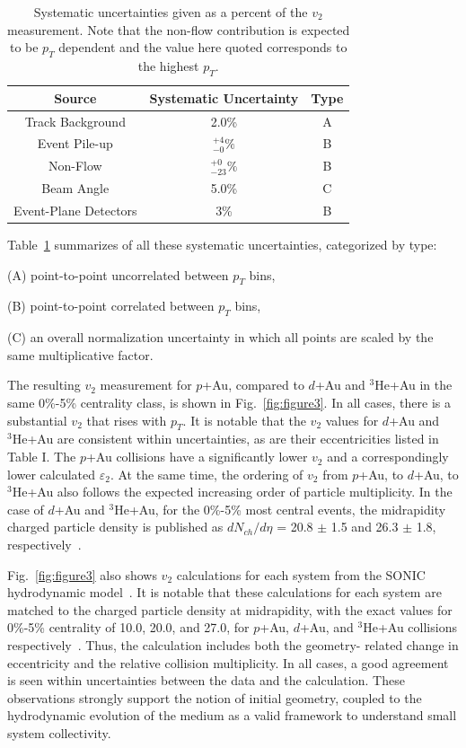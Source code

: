 \documentclass[%
reprint,
showpacs,preprintnumbers,
 amsmath,amssymb,
 aps,
]{revtex4-1}
\newcommand{\pt}{\mbox{$p_T$}\xspace}
\newcommand{\dau}{\mbox{$d$+Au}\xspace}
\newcommand{\pau}{\mbox{$p$+Au}\xspace}
\newcommand{\hau}{\mbox{$^3\text{He}$+Au}\xspace}
\begin{document}
\label{s:sys}
\begin{table}[htbp]
  \begin{center}
    \begin{tabular}{ccc}
      \hline
      \hline
      Source& Systematic Uncertainty & Type \\ \hline
      Track Background &2.0\%& A\\ 
      Event Pile-up    &$^{+4}_{-0}\%$& B\\
      Non-Flow    &$^{+0}_{-23}\%$& B\\
      Beam Angle &5.0\%& C\\  
      Event-Plane Detectors & 3\% & B\\
    \hline
    \hline
    \end{tabular}
   \caption{\label{t:sys}Systematic uncertainties given as a percent of the $v_2$ measurement. Note that the non-flow contribution is expected to be \pt dependent and the value here quoted corresponds to the highest \pt.}
   \end{center}
 \end{table}

Table~\ref{t:sys} summarizes of all these systematic
uncertainties, categorized by type:

(A) point-to-point uncorrelated between $p_T$ bins,

(B) point-to-point correlated between $p_T$ bins,

(C) an overall normalization uncertainty in which all points are scaled by the same multiplicative factor.

The resulting $v_2$ measurement for \pau, compared to \dau and \hau in the same 0\%-5\% centrality class, is shown in Fig.~\ref{fig:figure3}. In all cases, there is a substantial $v_2$ that rises with \pt. It is notable that the $v_2$ values for \dau and \hau are consistent within uncertainties, as are their eccentricities listed in Table I. The \pau collisions have a significantly lower $v_2$ and a correspondingly lower calculated $\varepsilon_2$. At the same time, the ordering of $v_2$ from \pau, to \dau, to \hau also follows the expected increasing order of particle multiplicity. In the case of \dau and \hau, for the 0\%-5\% most central events, the midrapidity charged particle density is published as $dN_{ch}/d\eta$ = 20.8 $\pm$ 1.5 and 26.3 $\pm$ 1.8, respectively~\cite{Adare:2015bua}. 

Fig.~\ref{fig:figure3} also shows $v_2$ calculations for each system from the SONIC hydrodynamic model~\cite{Habich:2014jna}. It is notable that these calculations for each system are matched to the charged particle density at midrapidity, with the exact values for 0\%-5\% centrality of 10.0, 20.0, and 27.0, for \pau, \dau, and \hau collisions respectively~\cite{Habich:2014jna}. Thus, the calculation includes both the geometry- related change in eccentricity and the relative collision multiplicity. In all cases, a good agreement is seen within uncertainties between the data and the calculation. These observations strongly support the notion of initial geometry, coupled to the hydrodynamic evolution of the medium as a valid framework to understand small system collectivity.
\end{document}
